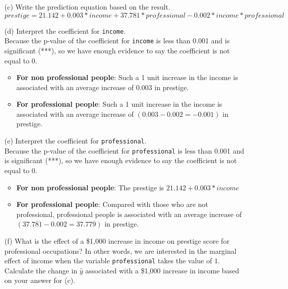 \documentclass[12pt,letterpaper]{article}
\begin{document}
\begin{enumerate}
	\vspace{.5cm}

	\item [(c)]
	Write the prediction equation based on the result.\\
	
	$prestige = 21.142 + 0.003 * income + 37.781 * professional - 0.002 * income * professional$
	
	\vspace{.5cm}
	\item [(d)]
	Interpret the coefficient for \texttt{income}.\\
	
	Because the p-value of the coefficient for \texttt{income} is less than 0.001 and is significant (***), so we have enough evidence to say the coefficient is not equal to 0.
	\begin{itemize}
		\item \textbf{For non professional people}: Such a 1 unit increase in the income is associated with an average increase of 0.003 in prestige.
		\item \textbf{For professional people}: Such a 1 unit increase in the income is associated with an average increase of $(0.003 - 0.002 = -0.001)$ in prestige.
	\end{itemize}
	\vspace{.5cm}
	\item [(e)]
	Interpret the coefficient for \texttt{professional}.\\
	
	Because the p-value of the coefficient for \texttt{professional} is less than 0.001 and is significant (***), so we have enough evidence to say the coefficient is not equal to 0.
	\begin{itemize}
		\item  \textbf{For non professional people}: The prestige is $21.142 + 0.003 * income$
		\item \textbf{For professional people}: Compared with those who are not professional, professional people is associated with an average increase of $(37.781 - 0.002 = 37.779)$ in prestige.
	\end{itemize}
	\newpage
	\item [(f)]
	What is the effect of a \$1,000 increase in income on prestige score for professional occupations? In other words, we are interested in the marginal effect of income when the variable \texttt{professional} takes the value of $1$. Calculate the change in $\hat{y}$ associated with a \$1,000 increase in income based on your answer for (c).\\


\end{enumerate}
\end{document}

